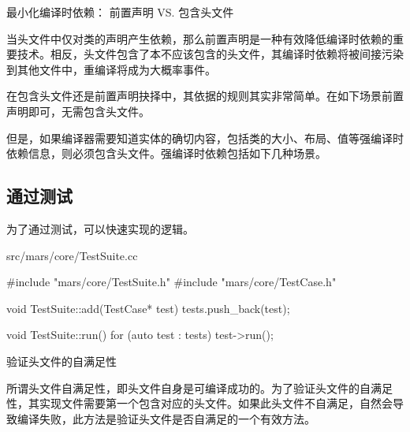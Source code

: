 \begin{content}
\begin{episode}{最小化编译时依赖： 前置声明 VS. 包含头文件}
\begin{content}

当头文件中仅对类的声明产生依赖，那么前置声明是一种有效降低编译时依赖的重要技术。相反，头文件包含了本不应该包含的头文件，其编译时依赖将被间接污染到其他文件中，重编译将成为大概率事件。

在包含头文件还是前置声明抉择中，其依据的规则其实非常简单。在如下场景前置声明即可，无需包含头文件。

\begin{enum}
\end{enum}

但是，如果编译器需要知道实体的确切内容，包括类的大小、布局、值等强编译时依赖信息，则必须包含头文件。强编译时依赖包括如下几种场景。

\begin{enum}
\end{enum}

\end{content}

\end{episode}

\subsection{通过测试}

为了通过测试，可以快速实现的逻辑。

\begin{nodiff}{src/mars/core/TestSuite.cc}
 \begin{c++}
#include "mars/core/TestSuite.h"
#include "mars/core/TestCase.h"

void TestSuite::add(TestCase* test) {
  tests.push_back(test);
}

void TestSuite::run() {
  for (auto test : tests) {
    test->run();
  }
}
 \end{c++}
\end{nodiff}

\begin{episode}{验证头文件的自满足性}

\begin{content}

所谓头文件自满足性，即头文件自身是可编译成功的。为了验证头文件的自满足性，其实现文件需要第一个包含对应的头文件。如果此头文件不自满足，自然会导致编译失败，此方法是验证头文件是否自满足的一个有效方法。


\end{content}
\end{episode}
\end{content}
